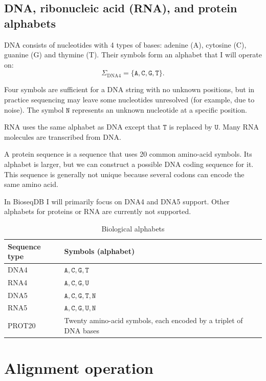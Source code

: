 \subsection{DNA, ribonucleic acid (RNA), and protein alphabets}

DNA consists of nucleotides with 4 types of bases: adenine (A), cytosine (C), guanine (G) and thymine (T). Their symbols form an alphabet that I will operate on:
\[
  \Sigma_{\mathrm{DNA4}} =
  \{\mathtt{A},\mathtt{C},\mathtt{G},\mathtt{T}\}.
\]

Four symbols are sufficient for a DNA string with no unknown positions, but in practice sequencing may leave some nucleotides unresolved (for example, due to noise). The symbol \(\mathtt{N}\) represents an unknown nucleotide at a specific position.

RNA uses the same alphabet as DNA except that \(\mathtt{T}\) is replaced by \(\mathtt{U}\). Many RNA molecules are transcribed from DNA.~\cite{crick_central_dogma_1970}

A protein sequence is a sequence that uses 20 common amino-acid symbols. Its alphabet is larger, but we can construct a possible DNA coding sequence for it. This sequence is generally not unique because several codons can encode the same amino acid.

In BioseqDB I will primarily focus on DNA4 and DNA5 support. Other alphabets for proteins or RNA are currently not supported.

\begin{table}[H]
  \centering
  \small
  \setlength{\tabcolsep}{4pt}
  \begin{tabular}{@{}ll@{}}
    \toprule
    Sequence type & Symbols (alphabet) \\
    \midrule
    DNA4 &
    \(\mathtt{A,C,G,T}\) \\
    RNA4 &
    \(\mathtt{A,C,G,U}\) \\
    DNA5 &
    \(\mathtt{A,C,G,T,N}\) \\
    RNA5 &
    \(\mathtt{A,C,G,U,N}\) \\
    PROT20 &
    Twenty amino-acid symbols, each encoded by a triplet of DNA bases \\
    \bottomrule
  \end{tabular}
  \caption{Biological alphabets}
  \label{tab:biological-alphabets}
\end{table}

\section{Alignment operation}

